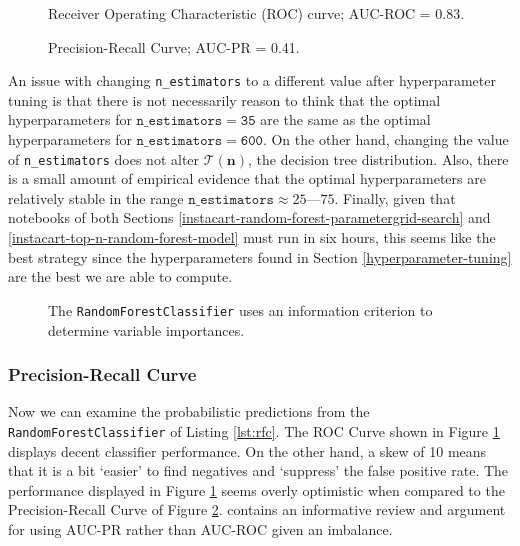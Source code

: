 \documentclass[11pt]{article}
\theoremstyle{definition}
\numberwithin{equation}{section}
\begin{document}
\begin{figure}[p]
\centering
\caption[ROC Curve]{Receiver Operating Characteristic (ROC) curve; AUC-ROC = 0.83.}
\label{fig:roc}
\end{figure}

\begin{figure}[p]
\centering
\caption[Precision-Recall Curve]{Precision-Recall Curve; AUC-PR = 0.41.}
\label{fig:precision-recall}
\end{figure}


An issue with changing \texttt{n\_estimators} to a different value after hyperparameter tuning 
is that there is not necessarily reason to think that the optimal hyperparameters for 
$\mathtt{n\_estimators = 35}$ are the same as the optimal hyperparameters for 
$\mathtt{n\_estimators = 600}$. On the other hand, changing the value of 
\texttt{n\_estimators} does not alter $\mathcal{T} (\mathbf{n})$, the decision tree distribution.
 Also, there is a small amount of empirical evidence that the optimal 
 hyperparameters are relatively stable in the range 
 $\mathtt{n\_estimators} \approx 25 \text{---} 75$. 
 Finally, given that notebooks of both Sections 
 \ref{instacart-random-forest-parametergrid-search} and 
 \ref{instacart-top-n-random-forest-model} must run in six hours, 
 this seems like the best strategy since the hyperparameters found in 
 Section \ref{hyperparameter-tuning} are the best we are able to compute.

\begin{figure}[]
\centering
\caption[\texttt{RandomForestClassifier} Variable Importance]{The \texttt{RandomForestClassifier} uses an information criterion to determine variable importances.}
\label{fig:variable-importances}
\end{figure}


\hypertarget{precision-recall-curve}{%
  \subsubsection{Precision-Recall Curve}\label{precision-recall-curve}}

Now we can examine the probabilistic predictions from the \texttt{RandomForestClassifier} of Listing \ref{lst:rfc}. The ROC Curve shown in Figure \ref{fig:roc} displays decent classifier performance. On the other hand, a skew of 10 means that it is a bit `easier' to find negatives and `suppress' the false positive rate. The performance displayed in Figure \ref{fig:roc} seems overly optimistic when compared to the Precision-Recall Curve of Figure \ref{fig:precision-recall}. \cite{brownleeHowWhenUse2018} contains an informative review and argument for using AUC-PR rather than AUC-ROC given an imbalance.
\end{document}
